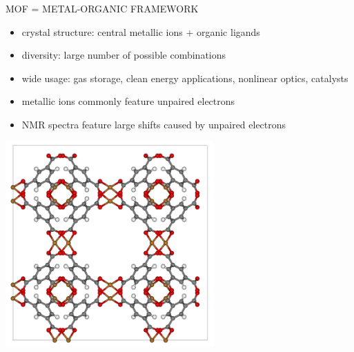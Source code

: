 \documentclass[slovene, usenames,dvipsnames]{beamer}
\begin{document}
\begin{frame}{MOF = METAL-ORGANIC FRAMEWORK }
  \begin{minipage}[]{0.5\textwidth}
    \begin{itemize}
       \item crystal structure: central metallic ions + organic ligands 
       \item diversity: large number of possible combinations  
       \item wide usage: gas storage, clean energy applications,
      nonlinear optics, catalysts
       \item metallic ions commonly feature unpaired electrons
       \item NMR spectra feature large shifts caused by unpaired electrons
    \end{itemize}
  \end{minipage}%
  \begin{minipage}[]{0.5\textwidth}
    \begin{minipage}[]{\textwidth}
      \centering
      \includegraphics[width=0.6\textwidth]{hkust.png}
    \end{minipage}
    
    \begin{minipage}[]{\textwidth}
      \centering
\end{minipage}
\end{minipage}
\end{frame}
\end{document}
